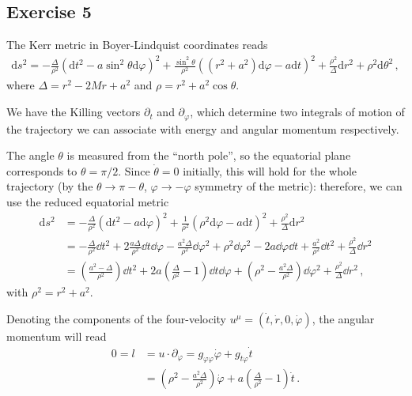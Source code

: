 \documentclass[main.tex]{subfiles}
\begin{document}

\subsection{Exercise 5}

The Kerr metric in Boyer-Lindquist coordinates reads %
\begin{align}
\mathrm{d}s^2 = - \frac{\Delta}{\rho^2} 
\left(\mathrm{d}t^2 - a \sin^2 \theta \mathrm{d}\varphi \right)^2
+ \frac{\sin^2 \theta}{\rho^2}
\left( (r^2 + a^2) \mathrm{d}\varphi - a \mathrm{d}t\right)^2
+ \frac{\rho^2}{\Delta } \mathrm{d}r^2 + \rho^2 \mathrm{d}\theta^2
\,,
\end{align}
%
where \(\Delta = r^2 - 2Mr + a^2\) and \(\rho = r^2 + a^2 \cos \theta \).

We have the Killing vectors \(\partial_t\) and \(\partial_\varphi \), which determine two integrals of motion of the trajectory we can associate with energy and angular momentum respectively. 

The angle \(\theta\) is measured from the ``north pole'', so the equatorial plane corresponds to \(\theta = \pi / 2\). Since \(\dot{\theta} = 0\) initially, this will hold for the whole trajectory (by the \(\theta \to \pi - \theta \), \(\varphi \to - \varphi \) symmetry of the metric): therefore, we can use the reduced equatorial metric %
\begin{align}
\mathrm{d}s^2 &= - \frac{\Delta}{\rho^2} 
\left(\mathrm{d}t^2 - a \mathrm{d}\varphi \right)^2
+ \frac{1}{\rho^2}
\left( \rho^2 \mathrm{d}\varphi - a \mathrm{d}t\right)^2
+ \frac{\rho^2}{\Delta } \mathrm{d}r^2   \\
&= 
- \frac{\Delta}{\rho^2} \dd{t^2} 
+ 2 \frac{a \Delta }{\rho^2} \dd{t} \dd{\varphi } 
- \frac{a^2\Delta }{\rho^2} \dd{\varphi^2} 
+ \rho^2 \dd{\varphi^2} 
- 2a \dd{\varphi } \dd{t} + \frac{a^2}{\rho^2} \dd{t}^2 + \frac{\rho^2}{\Delta } \dd{r^2}  \\
&= \left( \frac{a^2 - \Delta }{\rho^2}\right) \dd{t^2} 
+ 2a \left( \frac{\Delta}{\rho^2} - 1 \right) \dd{t} \dd{\varphi } 
+ \left(\rho^2 - \frac{a^2 \Delta }{\rho^2}\right) \dd{\varphi^2} + \frac{\rho^2}{\Delta } \dd{r^2}
\,,
\end{align}
%
with \(\rho^2 = r^2 + a^2\). 

Denoting the components of the four-velocity \(u^\mu = (\dot{t}, \dot{r}, 0, \dot{\varphi})\), the angular momentum will read %
\begin{align}
0 = l &= u \cdot \partial_\varphi = g_{\varphi \varphi } \dot{\varphi} + g_{t \varphi } \dot{t}  \\
&= \left(\rho^2 - \frac{a^2 \Delta }{\rho^2}\right) \dot{\varphi}
+ a  \left( \frac{\Delta}{\rho^2} - 1 \right) \dot{t}
\,.
\end{align}
\end{document}
